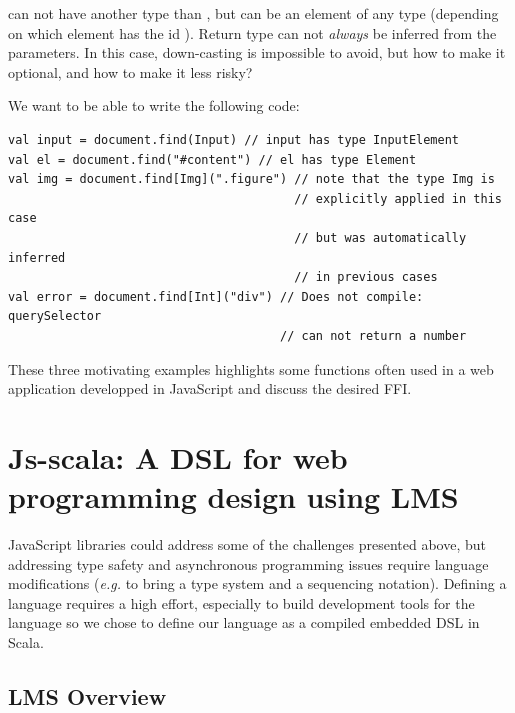 \documentclass[runningheads,a4paper]{llncs}
\newcommand{\eg}{\emph{e.g.}}
\begin{document}
 can not have another type than , but  can be an element of
any type (depending on which element has the id ). Return type can not \emph{always}
be inferred from the parameters. In this case, down-casting is impossible to avoid, but how to make
it optional, and how to make it less risky?

We want to be able to write the following code:

\begin{lstlisting}
val input = document.find(Input) // input has type InputElement
val el = document.find("#content") // el has type Element
val img = document.find[Img](".figure") // note that the type Img is 
                                        // explicitly applied in this case
                                        // but was automatically inferred 
                                        // in previous cases
val error = document.find[Int]("div") // Does not compile: querySelector 
                                      // can not return a number
\end{lstlisting}

These three motivating examples highlights some functions often used in a web application developped in JavaScript and discuss the desired FFI. 


\section{Js-scala: A DSL for web programming design using LMS}


JavaScript libraries could address some of the challenges presented above, but addressing type safety and
asynchronous programming issues require language modifications (\eg{} to bring a type system and a sequencing
notation). Defining a language requires a high effort, especially to build development tools for the language so we
chose to define our language as a compiled embedded DSL in Scala.


\subsection{LMS Overview}
\end{document}
